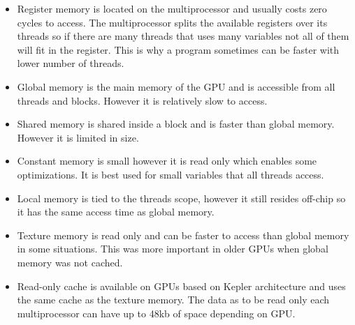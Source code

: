 \documentclass[10pt,a4paper]{report}
\begin{document}
\begin{itemize}
  \item Register memory is located on the multiprocessor and usually costs zero cycles to access. The multiprocessor splits the available registers over its threads so if there are many threads that uses many variables not all of them will fit in the register. This is why a program sometimes can be faster with lower number of threads.\cite{cuda}
  \item Global memory is the main memory of the GPU and is accessible from all threads and blocks. However it is relatively slow to access.\cite{cuda}
  \item Shared memory is shared inside a block and is faster than global memory. However it is limited in size.\cite{cuda}
  \item Constant memory is small however it is read only which enables some optimizations. It is best used for small variables that all threads access.\cite{cuda}
  \item Local memory is tied to the threads scope, however it still resides off-chip so it has the same access time as global memory.\cite{cuda}
  \item Texture memory is read only and can be faster to access than global memory in some situations. This was more important in older GPUs when global memory was not cached.\cite{plink_gpu, cuda}
  \item Read-only cache is available on GPUs based on Kepler architecture and uses the same cache as the texture memory. The data as to be read only each multiprocessor can have up to 48kb of space depending on GPU.\cite{kepler_tuning_guide}
\end{itemize}
\end{document}
